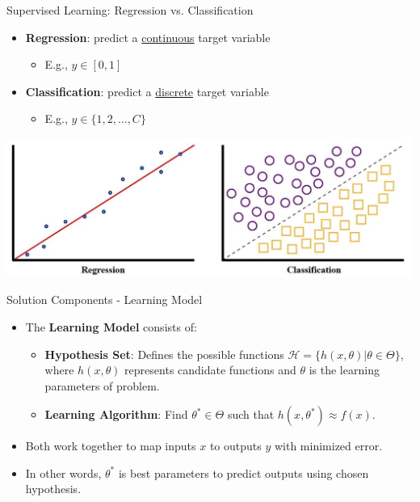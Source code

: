 \documentclass[serif, aspectratio=169]{beamer}
\begin{document}
\begin{frame}{Supervised Learning: Regression vs. Classification}

    \begin{itemize}
        \item \textbf{Regression}: predict a \underline{continuous} target variable
        \begin{itemize}
            \item E.g., $y \in [0, 1]$
        \end{itemize}
        \item \textbf{Classification}: predict a \underline{discrete} target variable
        \begin{itemize}
            \item E.g., $y \in \{1, 2, \ldots, C\}$
        \end{itemize}
    \end{itemize}

        \centering
        \includegraphics[width=0.8\linewidth]{pic/regressionVSclassification.jpg}



\end{frame}



\begin{frame}{Solution Components - Learning Model}
    \begin{itemize}
        \item The \textbf{Learning Model} consists of:
        \begin{itemize}
            \item \textbf{Hypothesis Set}: Defines the possible functions \( \mathcal{H} = \{h(x, \theta) | \theta \in \Theta\} \), where \( h(x, \theta) \) represents candidate functions and \( \theta \) is the learning parameters of problem.
            \item \textbf{Learning Algorithm}: Find \( \theta^* \in \Theta \) such that \( h(x, \theta^*) \approx f(x) \).
        \end{itemize}
        \item Both work together to map inputs \(x\) to outputs \(y\) with minimized error.
        \item In other words, \( \theta^* \) is best parameters to predict outputs using chosen hypothesis.
    \end{itemize}
    \vspace{0.5cm}
\end{frame}
\end{document}
